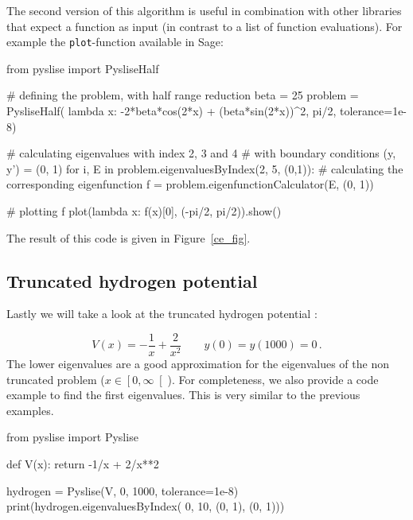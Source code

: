 The second version of this algorithm is useful in combination with other libraries that expect a function as input (in contrast to a list of function evaluations). For example the \texttt{plot}-function available in Sage:
\begin{python}
from pyslise import PysliseHalf

# defining the problem, with half range reduction
beta = 25
problem = PysliseHalf(
    lambda x: -2*beta*cos(2*x) + (beta*sin(2*x))^2,
    pi/2, tolerance=1e-8)

# calculating eigenvalues with index 2, 3 and 4
# with boundary conditions (y, y') = (0, 1)
for i, E in problem.eigenvaluesByIndex(2, 5, (0,1)):
    # calculating the corresponding eigenfunction
    f = problem.eigenfunctionCalculator(E, (0, 1))

    # plotting f
    plot(lambda x: f(x)[0], (-pi/2, pi/2)).show()
\end{python}

The result of this code is given in Figure~\ref{ce_fig}.


\subsection{Truncated hydrogen potential}

Lastly we will take a look at the truncated hydrogen potential \cite{pryce_sltstpak_1999}:

\begin{equation}
    V(x) = -\frac{1}{x} + \frac{2}{x^2}  \qquad y(0)=y(1000)=0 \,. \label{thp}
\end{equation}
The lower eigenvalues are a good approximation for the eigenvalues of the non truncated problem ($x \in \left[0, \infty\right[$). For completeness, we also provide a code example to find the first eigenvalues. This is very similar to the previous examples.

\begin{python}
from pyslise import Pyslise

def V(x):
return -1/x + 2/x**2

hydrogen = Pyslise(V, 0, 1000, tolerance=1e-8)
print(hydrogen.eigenvaluesByIndex(
                    0, 10, (0, 1), (0, 1)))
\end{python}

